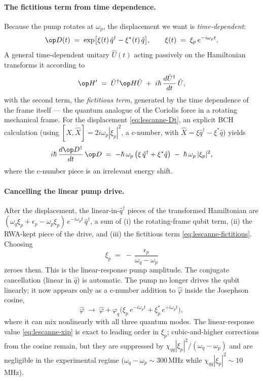 \paragraph{The fictitious term from time dependence.}
Because the pump rotates at $\omega_p$, the displacement we want is
\emph{time-dependent}:
\begin{equation}
\label{eq:lescanne-Dt}
\op D(t) \;=\; \exp\bigl[\xi(t)\,\hat q^\dagger - \xi^*(t)\,\hat q\bigr],
\qquad \xi(t)\;=\;\xi_p\,e^{-i\omega_p t}.
\end{equation}
A general time-dependent unitary $\hat U(t)$ acting passively on the
Hamiltonian transforms it according to
\begin{equation}
\label{eq:time-dep-frame}
\op H' \;=\; \hat U^\dagger\op H\hat U
\;+\; i\hbar\,\frac{d\hat U^\dagger}{dt}\,\hat U,
\end{equation}
with the second term, the \emph{fictitious term}, generated by the
time dependence of the frame itself --- the quantum analogue of the
Coriolis force in a rotating mechanical frame. For the displacement
\cref{eq:lescanne-Dt}, an explicit BCH calculation (using
$[\hat X,\dot{\hat X}]=2i\omega_p|\xi_p|^2$, a c-number, with
$\hat X=\xi\hat q^\dagger-\xi^*\hat q$) yields
\begin{equation}
\label{eq:lescanne-fictitious}
i\hbar\,\frac{d\op D^\dagger}{dt}\,\op D
\;=\; -\hbar\,\omega_p\,\bigl(\xi\,\hat q^\dagger + \xi^*\hat q\bigr)
\;-\; \hbar\,\omega_p\,|\xi_p|^2,
\end{equation}
where the c-number piece is an irrelevant energy shift.

\paragraph{Cancelling the linear pump drive.}
After the displacement, the linear-in-$\hat q^\dagger$ pieces of the
transformed Hamiltonian are
$(\omega_q\xi_p + \epsilon_p - \omega_p\xi_p)\,e^{-i\omega_p t}\,\hat q^\dagger$,
a sum of (i) the rotating-frame qubit term, (ii) the RWA-kept piece of
the drive, and (iii) the fictitious term \cref{eq:lescanne-fictitious}.
Choosing
\begin{equation}
\label{eq:lescanne-xip}
\boxed{\;\xi_p \;=\; -\,\frac{\epsilon_p}{\omega_q-\omega_p}\;}
\end{equation}
zeroes them. This is the linear-response pump amplitude. The
conjugate cancellation (linear in $\hat q$) is automatic. The pump
no longer drives the qubit linearly; it now appears only as a
c-number addition to $\hat\varphi$ inside the Josephson cosine,
\begin{equation}
\hat\varphi \;\to\; \hat\varphi + \varphi_q\bigl(\xi_p\,e^{-i\omega_p t}+\xi_p^*\,e^{+i\omega_p t}\bigr),
\end{equation}
where it can mix nonlinearly with all three quantum modes. The
linear-response value \cref{eq:lescanne-xip} is exact to leading
order in $\xi_p$; cubic-and-higher corrections from the cosine
remain, but they are suppressed by $\chi_{qq}|\xi_p|^2/(\omega_q-\omega_p)$
and are negligible in the experimental regime
($\omega_q-\omega_p\sim 300$\,MHz while $\chi_{qq}|\xi_p|^2\sim 10$\,MHz).

